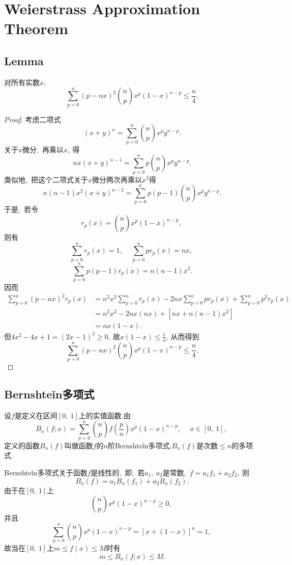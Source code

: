 \chapter{Weierstrass Approximation Theorem}
\section{Lemma}
\begin{lemma}
	对所有实数$x,\ $
	$$\sum\limits_{p=0}^{n}(p-nx)^2\binom{n}{p}x^p(1-x)^{n-p}\le\frac{n}{4}.$$
\end{lemma}
\begin{proof}
	考虑二项式
	$$(x+y)^n=\sum\limits_{p=0}^{n}\binom{n}{p}x^py^{n-p}.$$
	关于$x$微分,\ 再乘以$x,\ $得
	$$nx(x+y)^{n-1}=\sum\limits_{p=0}^{n}p\binom{n}{p}x^py^{n-p}.$$
	类似地,\ 把这个二项式关于$x$微分两次再乘以$x^2$得
	$$n(n-1)x^2(x+y)^{n-2}=\sum\limits_{p=0}^{n}p(p-1)\binom{n}{p}x^py^{n-p}.$$
	于是,\ 若令
	$$r_p(x)=\binom{n}{p}x^p(1-x)^{n-p},\ $$
	则有
	$$\sum\limits_{p=0}^{n}r_p(x)=1,\ \quad \sum\limits_{p=0}^{n}pr_p(x)=nx,\ $$
	$$\sum\limits_{p=0}^{n}p(p-1)r_p(x)=n(n-1)x^2.$$
	因而
	\begin{align*}
		\sum\limits_{p=0}^{n}(p-nx)^2r_p(x)&=n^2x^2\sum\limits_{p=0}^{n}r_p(x)-2nx\sum\limits_{p=0}^{n}pr_p(x)+\sum\limits_{p=0}^{n}p^2r_p(x)\\
		&=n^2x^2-2nx(nx)+\left[nx+n(n-1)x^2\right]\\
		&=nx(1-x).
	\end{align*}
	但$4x^2-4x+1=(2x-1)^2\ge0,\ $故$x(1-x)\le\frac{1}{4},\ $从而得到
	$$\sum\limits_{p=0}^{n}(p-nx)^2\binom{n}{p}x^p(1-x)^{n-p}\le\frac{n}{4}.$$
\end{proof}
\section{Bernshte\v{i}n多项式}
\begin{definition}
	设$f$是定义在区间$\left[0,\ 1\right]$上的实值函数.由
	$$B_n(f;x)=\sum\limits_{p=0}^{n}\binom{n}{p}f\left(\frac{p}{n}\right)x^p(1-x)^{n-p},\ \quad x\in\left[0,\ 1\right],\ $$
	定义的函数$B_n(f)$叫做函数$f$的$n$阶Bernshte\v{i}n多项式.$B_n(f)$是次数$\le n$的多项式.
\end{definition}
Bernshte\v{i}n多项式关于函数$f$是线性的,\ 即,\ 若$a_1,\ a_2$是常数,\ $f=a_1f_1+a_2f_2,\ $则
$$B_n(f)=a_1B_n(f_1)+a_2B_n(f_2).$$
由于在$\left[0,\ 1\right]$上
$$\binom{n}{p}x^p(1-x)^{n-p}\ge 0,\ $$
并且
\begin{equation}
	\sum\limits_{p=0}^{n}\binom{n}{p}x^p(1-x)^{n-p}=\left[x+(1-x)\right]^n=1,\ \label{eq28}
\end{equation}
故当在$\left[0,\ 1\right]$上$m\le f(x)\le M$时有
$$m\le B_n(f;x)\le M.$$

